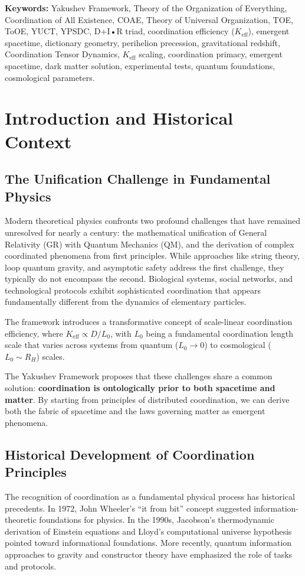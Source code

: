 \documentclass[11pt,a4paper]{article}
\begin{document}
	\noindent\textbf{Keywords:} Yakushev Framework, Theory of the Organization of Everything,  Coordination of All Existence, COAE, Theory of Universal Organization, TOE, ToOE, YUCT, YPSDC, D+I•R triad, coordination efficiency ($K_{\mathrm{eff}}$), emergent spacetime, dictionary geometry, perihelion precession, gravitational redshift, Coordination Tensor Dynamics, $K_{\mathrm{eff}}$ scaling, coordination primacy, emergent spacetime, dark matter solution, experimental tests, quantum foundations, cosmological parameters.
	\newpage
	\tableofcontents
	
	\newpage
	
	\section{Introduction and Historical Context}
	\subsection{The Unification Challenge in Fundamental Physics}
	Modern theoretical physics confronts two profound challenges that have remained unresolved for nearly a century: the mathematical unification of General Relativity (GR) with Quantum Mechanics (QM), and the derivation of complex coordinated phenomena from first principles. While approaches like string theory, loop quantum gravity, and asymptotic safety address the first challenge, they typically do not encompass the second. Biological systems, social networks, and technological protocols exhibit sophisticated coordination that appears fundamentally different from the dynamics of elementary particles.
	
	The framework introduces a transformative concept of scale-linear coordination efficiency,
	where $K_{\mathrm{eff}} \propto D/L_0$, with $L_0$ being a fundamental 
	coordination length scale that varies across systems from quantum ($L_0 \to 0$) 
	to cosmological ($L_0 \sim R_H$) scales.
	
	
	The Yakushev Framework proposes that these challenges share a common solution: \textbf{coordination is ontologically prior to both spacetime and matter}. By starting from principles of distributed coordination, we can derive both the fabric of spacetime and the laws governing matter as emergent phenomena.
	
	\subsection{Historical Development of Coordination Principles}
	The recognition of coordination as a fundamental physical process has historical precedents. In 1972, John Wheeler's ``it from bit'' concept suggested information-theoretic foundations for physics. In the 1990s, Jacobson's thermodynamic derivation of Einstein equations and Lloyd's computational universe hypothesis pointed toward informational foundations. More recently, quantum information approaches to gravity and constructor theory have emphasized the role of tasks and protocols.
\end{document}
